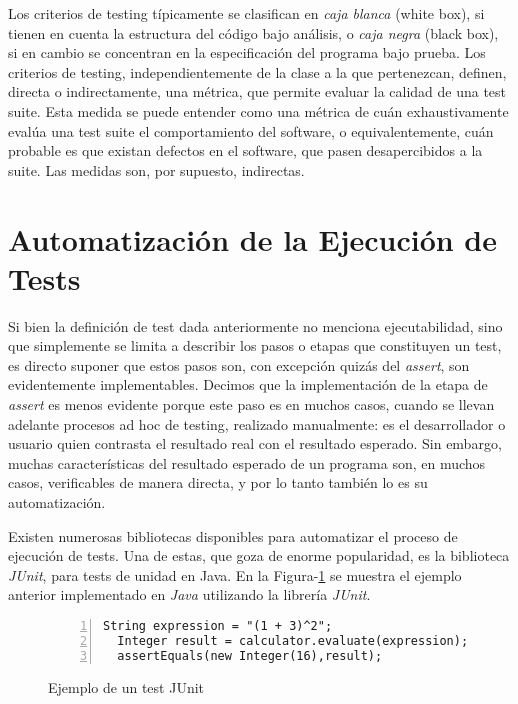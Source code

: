 Los criterios de testing t\'ipicamente se clasifican en \emph{caja blanca} (white box), si tienen en cuenta la estructura del c\'odigo bajo an\'alisis, o \emph{caja negra} (black box), si en cambio se concentran en la especificaci\'on del programa bajo prueba. Los criterios de testing, independientemente de la clase a la que pertenezcan, definen, directa o indirectamente, una m\'etrica, que permite evaluar la calidad de una test suite. Esta medida se puede entender como una m\'etrica de cu\'an exhaustivamente eval\'ua una test suite el comportamiento del software, o equivalentemente, cu\'an probable es que existan defectos en el software, que pasen desapercibidos a la suite. Las medidas son, por supuesto, indirectas. 

\section{Automatizaci\'on de la Ejecuci\'on de Tests}
\label{sec:preliminares.testing.automation}

Si bien la definici\'on de test dada anteriormente no menciona ejecutabilidad, sino que simplemente se limita a describir los pasos o etapas que constituyen un test, es directo suponer que estos pasos son, con excepci\'on quiz\'as del \emph{assert}, son evidentemente implementables. Decimos que la implementaci\'on de la etapa de \emph{assert} es menos evidente porque este paso es en muchos casos, cuando se llevan adelante procesos ad hoc de testing, realizado manualmente: es el desarrollador o usuario quien contrasta el resultado real con el resultado esperado. Sin embargo, muchas caracter\'isticas del resultado esperado de un programa son, en muchos casos, verificables de manera directa, y por lo tanto tambi\'en lo es su automatizaci\'on. 

Existen numerosas bibliotecas disponibles para automatizar el proceso de ejecuci\'on de tests. Una de estas, que goza de enorme popularidad, es la biblioteca \emph{JUnit}, para tests de unidad en Java. En la Figura-\ref{figures.examples.test.junit} se muestra el ejemplo anterior implementado en \emph{Java} utilizando la librer\'ia \emph{JUnit}.

\begin{figure}[ht!]
	\begin{lstlisting}[frame=single, mathescape=true,numbers=left,framexleftmargin=1.5em]
  String expression = "(1 + 3)^2";
  Integer result = calculator.evaluate(expression);
  assertEquals(new Integer(16),result);
	\end{lstlisting}
	\caption{Ejemplo de un test JUnit}
	\label{figures.examples.test.junit}
\end{figure}

